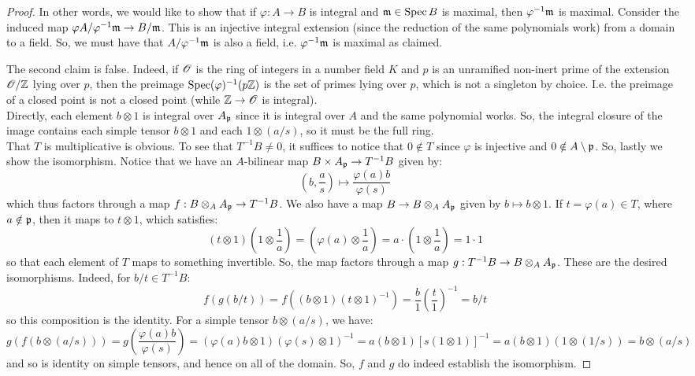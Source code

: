 \begin{proof}
	In other words, we would like to show that if $\varphi : A \to B$ is integral and $\mathfrak{m} \in \operatorname{Spec} B$ is maximal, then $\varphi^{-1}\mathfrak{m}$ is maximal. Consider the induced map $\varphi A/\varphi^{-1}\mathfrak{m} \to B/\mathfrak{m}$. This is an injective integral extension (since the reduction of the same polynomials work) from a domain to a field. So, we must have that $A/\varphi^{-1}\mathfrak{m}$ is also a field, i.e. $\varphi^{-1}\mathfrak{m}$ is maximal as claimed.
	
	The second claim is false. Indeed, if $\mathscr{O}$ is the ring of integers in a number field $K$ and $p$ is an unramified non-inert prime of the extension $\mathscr{O}/\mathbb{Z}$ lying over $p$, then the preimage $\operatorname{Spec}(\varphi)^{-1}(p\mathbb{Z})$ is the set of primes lying over $p$, which is not a singleton by choice. I.e. the preimage of a closed point is not a closed point (while $\mathbb{Z} \to \mathscr{O}$ is integral). \\
	
	Directly, each element $b \otimes 1$ is integral over $A_{\mathfrak{p}}$ since it is integral over $A$ and the same polynomial works. So, the integral closure of the image contains each simple tensor $b \otimes 1$ and each $1 \otimes (a/s)$, so it must be the full ring. \\
	
	That $T$ is multiplicative is obvious. To see that $T^{-1}B \neq 0$, it suffices to notice that $0 \notin T$ since $\varphi$ is injective and $0 \notin A \setminus \mathfrak{p}$. So, lastly we show the isomorphism. Notice that we have an $A$-bilinear map $B \times A_{\mathfrak{p}} \to T^{-1}B$ given by:
	\[ \left(b,\frac{a}{s}\right) \mapsto \frac{\varphi(a)b}{\varphi(s)} \]
	which thus factors through a map $f : B \otimes_A A_{\mathfrak{p}} \to T^{-1}B$. We also have a map $B \to B \otimes_A A_{\mathfrak{p}}$ given by $b \mapsto b \otimes 1$. If $t = \varphi(a) \in T$, where $a \notin \mathfrak{p}$, then it maps to $t \otimes 1$, which satisfies:
	\[ (t \otimes 1)\left(1 \otimes \frac{1}{a}\right) = \left(\varphi(a) \otimes \frac{1}{a}\right) = a \cdot \left(1 \otimes \frac{1}{a}\right) = 1 \cdot 1 \]
	so that each element of $T$ maps to something invertible. So, the map factors through a map $g : T^{-1}B \to B \otimes_A A_{\mathfrak{p}}$. These are the desired isomorphisms. Indeed, for $b/t \in T^{-1}B$:
	\[ f(g(b/t)) = f((b \otimes 1)(t \otimes 1)^{-1}) = \frac{b}{1}\left(\frac{t}{1}\right)^{-1} = b/t \]
	so this composition is the identity. For a simple tensor $b \otimes (a/s)$, we have:
	\[ g(f(b \otimes (a/s))) = g\left(\frac{\varphi(a)b}{\varphi(s)}\right) = (\varphi(a)b \otimes 1)(\varphi(s) \otimes 1)^{-1} = a(b \otimes 1)[s(1 \otimes 1)]^{-1} = a(b \otimes 1)(1 \otimes (1/s)) = b \otimes (a/s) \]
	and so is identity on simple tensors, and hence on all of the domain. So, $f$ and $g$ do indeed establish the isomorphism.
	

\end{proof}
